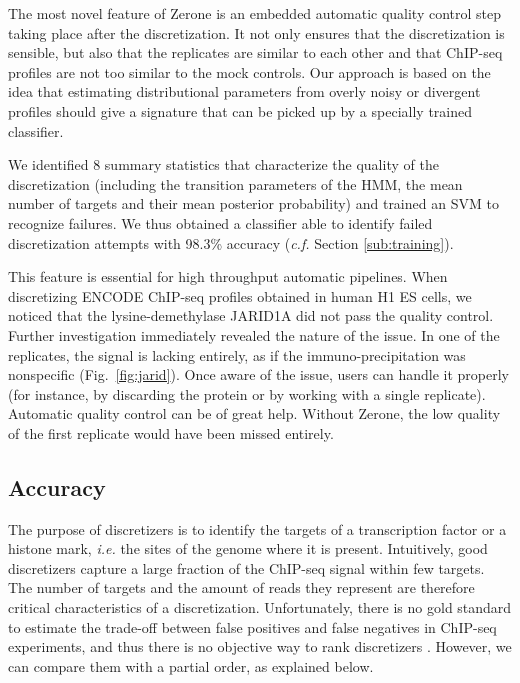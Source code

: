 \documentclass{bioinfo}
\begin{document}
The most novel feature of Zerone is an embedded automatic quality
control step taking place after the discretization. It not only
ensures that the discretization is sensible, but also that the
replicates are similar to each other and that ChIP-seq profiles
are not too similar to the mock controls. Our approach is based
on the idea that estimating distributional parameters from
overly noisy or divergent profiles should give a signature that
can be picked up by a specially trained classifier.

We identified 8 summary statistics that characterize the quality of
the discretization (including the transition parameters of the HMM,
the mean number of targets and their mean posterior probability)
and trained an SVM to recognize failures. We thus obtained a
classifier able to identify failed discretization attempts
with 98.3\% accuracy (\textit{c.f.} Section \ref{sub:training}).

This feature is essential for high throughput automatic pipelines.
When discretizing ENCODE ChIP-seq profiles obtained in human H1
ES cells, we noticed that the lysine-demethylase JARID1A did
not pass the quality control.
Further investigation immediately revealed the nature of the issue.
In one of the replicates, the signal is lacking entirely, as if
the immuno-precipitation was nonspecific (Fig.~\ref{fig:jarid}).
Once aware of the issue, users can handle it properly (for instance,
by discarding the protein or by working with a single replicate).
Automatic quality control can be of great help. Without Zerone,
the low quality of the first replicate would have been missed
entirely.

\subsection{Accuracy}
The purpose of discretizers is to identify the targets of a
transcription factor or a histone mark, \textit{i.e.} the sites of
the genome where it is present.
Intuitively, good discretizers capture a large fraction of the
ChIP-seq signal within few targets. The number of targets
and the amount of reads they represent are therefore critical
characteristics of a discretization. Unfortunately, there is no gold
standard to estimate the trade-off between false positives and false
negatives in ChIP-seq experiments, and thus there is no objective way
to rank discretizers \citep{pmid21059603}. However, we can compare
them with a partial order, as explained below.
\end{document}
